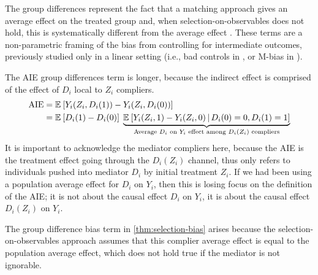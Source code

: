The group differences represent the fact that a matching approach gives an average effect on the treated group and, when selection-on-observables does not hold, this is systematically different from the average effect \citep{heckman1998characterizing}.
These terms are a non-parametric framing of the bias from controlling for intermediate outcomes, previously studied only in a linear setting (i.e., bad controls in \citealt{cinelli2024crash}, or M-bias in \citealt{ding2015adjust}).

The AIE group differences term is longer, because the indirect effect is comprised of the effect of $D_i$ local to $Z_i$ compliers.
\begin{align*}
    \text{AIE}
    &= \mathbb{E}_{} \left[ Y_i(Z_i, D_i(1)) - Y_i(Z_i, D_i(0)) \right] \\
    &= \mathbb{E}_{} \left[ D_i(1) - D_i(0) \right] \; 
        \underbrace{\mathbb{E}_{} \left[ Y_i(Z_i, 1) - Y_i(Z_i, 0) \, \middle\vert \, D_i(0)=0, D_i(1)=1 \right]}_{
            \text{Average $D_i$ on $Y_i$ effect among $D_i(Z_i)$ compliers}
        }
\end{align*}
It is important to acknowledge the mediator compliers here, because the AIE is the treatment effect going through the $D_i(Z_i)$ channel, thus only refers to individuals pushed into mediator $D_i$ by initial treatment $Z_i$.
If we had been using a population average effect for $D_i$ on $Y_i$, then this is losing focus on the definition of the AIE; it is not about the causal effect $D_i$ on $Y_i$, it is about the causal effect $D_i(Z_i)$ on $Y_i$.

The group difference bias term in \ref{thm:selection-bias} arises because the selection-on-observables approach assumes that this complier average effect is equal to the population average effect, which does not hold true if the mediator is not ignorable.
%